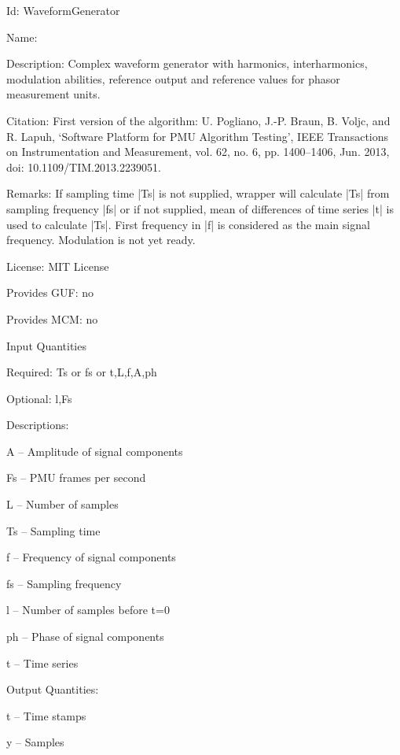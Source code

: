 \begin{tightdesc}
\item [Id:] WaveformGenerator
\item [Name:] 
\item [Description:] Complex waveform generator with harmonics, interharmonics, modulation abilities, reference output and reference values for phasor measurement units.
\item [Citation:] First version of the algorithm: U. Pogliano, J.-P. Braun, B. Voljc, and R. Lapuh, ‘Software Platform for PMU Algorithm Testing’, IEEE Transactions on Instrumentation and Measurement, vol. 62, no. 6, pp. 1400–1406, Jun. 2013, doi: 10.1109/TIM.2013.2239051.
\item [Remarks:] If sampling time |Ts| is not supplied, wrapper will calculate |Ts| from sampling frequency |fs| or if not supplied, mean of differences of time series |t| is used to calculate |Ts|. First frequency in |f| is considered as the main signal frequency. Modulation is not yet ready.
\item [License:] MIT License
\item [Provides GUF:] no
\item [Provides MCM:] no
\item [Input Quantities] \rule{0em}{0em}
    \begin{tightdesc}
    \item [Required:] 
        \textsf{Ts} or \textsf{fs} or \textsf{t},\enspace \textsf{L},\enspace \textsf{f},\enspace \textsf{A},\enspace \textsf{ph}
    \item [Optional:] 
        \textsf{l},\enspace \textsf{Fs}
    \item [Descriptions:] \rule{0em}{0em}
        \begin{tightdesc}
            \item[\textsf{A}] -- Amplitude of signal components
            \item[\textsf{Fs}] -- PMU frames per second
            \item[\textsf{L}] -- Number of samples
            \item[\textsf{Ts}] -- Sampling time
            \item[\textsf{f}] -- Frequency of signal components
            \item[\textsf{fs}] -- Sampling frequency
            \item[\textsf{l}] -- Number of samples before t=0
            \item[\textsf{ph}] -- Phase of signal components
            \item[\textsf{t}] -- Time series
        \end{tightdesc}
    \end{tightdesc}
\item [Output Quantities:] \rule{0em}{0em}
    \begin{tightdesc}
        \item[\textsf{t}] -- Time stamps
        \item[\textsf{y}] -- Samples
    \end{tightdesc}
\end{tightdesc}
